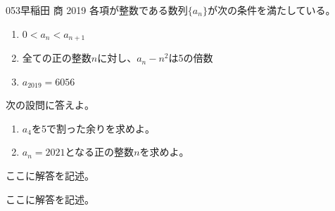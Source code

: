 \begin{prob}{053}{}{早稲田 商 2019}
 各項が整数である数列$\{a_n\}$が次の条件を満たしている。
 \begin{enumerate}[label=\roman*,align=CenterWithParen]
  \item $0<a_n<a_{n+1}$
  \item 全ての正の整数$n$に対し、$a_n-n^2$は5の倍数
  \item $a_{2019}=6056$
 \end{enumerate}
 次の設問に答えよ。
 \begin{enumerate}
  \item $a_4$を5で割った余りを求めよ。
  \item $a_n=2021$となる正の整数$n$を求めよ。
 \end{enumerate}
\end{prob}
ここに解答を記述。

ここに解答を記述。
